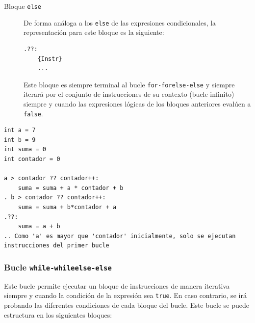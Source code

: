 \documentclass[11pt, english]{article}
\begin{document}
\begin{description}
	\item[Bloque \texttt{else}] De forma análoga a los \texttt{else} de las expresiones condicionales, la representación para este bloque es la siguiente:
	\begin{center}
\begin{lstlisting}
.??:
	{Instr}
	...
\end{lstlisting}
	\end{center}

	Este bloque es siempre terminal al bucle \texttt{for-forelse-else} y siempre iterará por el conjunto de instrucciones de su contexto (bucle infinito) siempre y cuando las expresiones lógicas de los bloques anteriores evalúen a \texttt{false}.
	\end{description}
\begin{lstlisting}[caption=Ejemplode uso del bucle for-forelse-else]
int a = 7
int b = 9
int suma = 0
int contador = 0

a > contador ?? contador++:
	suma = suma + a * contador + b
. b > contador ?? contador++:
	suma = suma + b*contador + a
.??:
	suma = a + b
.. Como 'a' es mayor que 'contador' inicialmente, solo se ejecutan instrucciones del primer bucle
\end{lstlisting}

\subsubsection{Bucle \texttt{while-whileelse-else}}\label{while}
Este bucle permite ejecutar un bloque de instrucciones de manera iterativa siempre y cuando la condición de la expresión sea \texttt{true}. En caso contrario, se irá probando las diferentes condiciones de cada bloque del bucle. Este bucle se puede estructura en los siguientes bloques:
\end{document}
